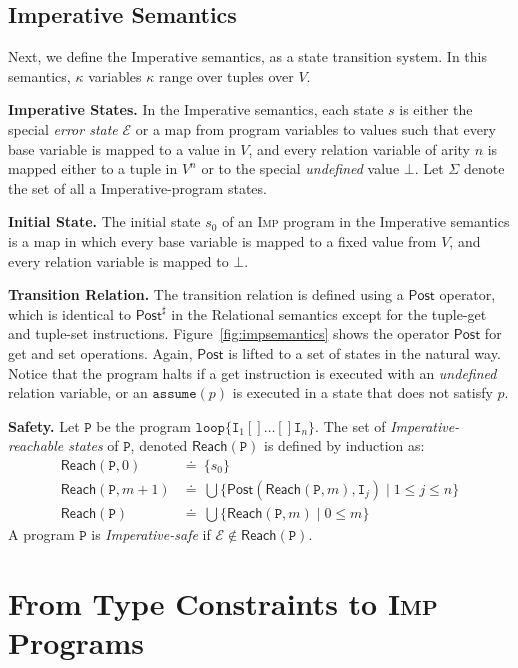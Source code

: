 \documentclass[nocopyrightspace]{sigplanconf}
\newcommand{\defeq}{\doteq\ }
\def\mypara#1{\smallskip\noindent\textbf{#1}}
\def\set#1{{\{ #1\}}}
\newcommand{\ERROR}{\mathit{Error}}
\newcommand{\kvar}{\kappa}
\newcommand{\ilang}{\textsc{Imp}\xspace}
\newcommand{\istate}{s}
\newcommand{\istates}{\Sigma}
\def\ASSUME{{{\mathtt{assume}}}}
\def\LOOP{{{\mathtt{loop}}}}
\def\vals{V}
\def\CHOOSE{{[\!]}}
\def\instr{\mathtt{I}}
\def\prgm{\mathtt{P}}
\def\rkvar{{\kvar}}
\def\RELSEM{{Relational}\xspace}
\def\IMPSEM{{Imperative}\xspace}
\def\REFREL{relation\xspace}
\def\ERROR{{\mathcal{E}}}
\def\rpost{\mathsf{Post}^{\sharp}}
\def\ipost{\mathsf{Post}}
\def\ireach{\mathsf{Reach}}
\begin{document}
\subsection{\IMPSEM Semantics}
\label{sec:impsemantics}

Next, we define the \IMPSEM semantics, as a state
transition system. In this semantics, $\rkvar$ variables 
$\rkvar$ range over tuples over $\vals$.

\mypara{\IMPSEM States.}
In the \IMPSEM semantics,
each state $\istate$ is either the special \emph{error state} $\ERROR$ 
or a map from program variables to values such that
every base variable is mapped to a value in $\vals$, and 
every \REFREL variable of arity $n$ is mapped either to 
a tuple in $\vals^n$ or to the special \emph{undefined} value $\bot$.
Let $\istates$ denote the set of all a \IMPSEM-program states. 

\mypara{Initial State.} 
The initial state $\istate_0$ of an \ilang program in the \IMPSEM semantics is a map in which
every base variable is mapped to a fixed value from $\vals$,
and every \REFREL variable is mapped to $\bot$.

\mypara{Transition Relation.}
The transition relation is defined using a $\ipost$ operator, 
which is identical to $\rpost$ in the \RELSEM semantics except 
for the tuple-get and tuple-set instructions.
Figure~\ref{fig:impsemantics} shows the operator $\ipost$ for get and set operations.
Again, $\ipost$ is lifted to a set of states in the natural way.
Notice that the program halts if a get instruction is executed with
an \emph{undefined} \REFREL variable, or an $\ASSUME(p)$ is executed in a state
that does not satisfy $p$.

\mypara{Safety.} 
Let $\prgm$ be the program $\LOOP\{ \instr_1 \CHOOSE \ldots \CHOOSE \instr_n \}$.
The set of \emph{\IMPSEM-reachable states} of $\prgm$, denoted $\ireach(\prgm)$ is 
defined by induction as:
$$
\begin{array}{ll}
\ireach(\prgm, 0)   & \defeq  \set{\istate_0}\\
\ireach(\prgm, m+1) & \defeq  \bigcup \set{\ipost(\ireach(\prgm, m), \instr_j) \mid 1 \leq j \leq n}\\
\ireach(\prgm)      & \defeq  \bigcup \set{\ireach(\prgm, m) \mid 0 \leq m}
\end{array}
$$
A program $\prgm$ is \emph{\IMPSEM-safe} if $\ERROR \not \in \ireach(\prgm)$.

\section{From Type Constraints to \ilang Programs} \label{sec:equiv}
\end{document}
